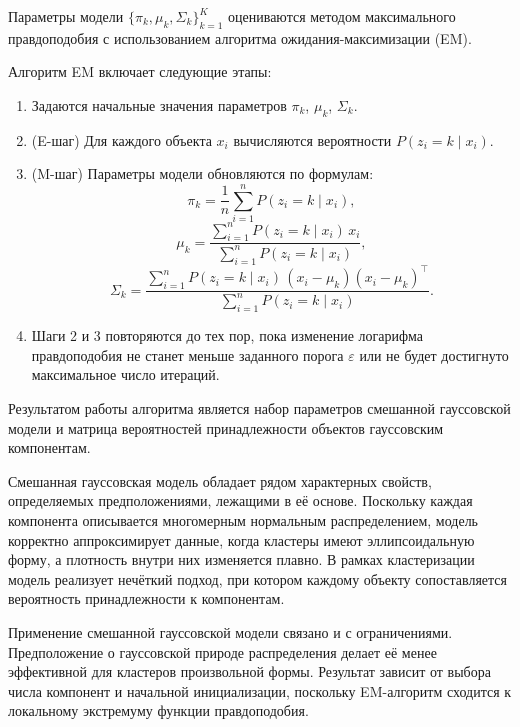 Параметры модели $\{\pi_k, \mu_k, \Sigma_k\}_{k=1}^{K}$ оцениваются методом максимального правдоподобия с использованием алгоритма ожидания-максимизации (EM).

Алгоритм EM включает следующие этапы:
\begin{enumerate}
\item Задаются начальные значения параметров $\pi_k$, $\mu_k$, $\Sigma_k$.
\item (E-шаг) Для каждого объекта $x_i$ вычисляются вероятности $P(z_i = k \mid x_i)$.
\item (M-шаг) Параметры модели обновляются по формулам:
\begin{equation}
\pi_k = \frac{1}{n} \sum_{i=1}^{n} P(z_i = k \mid x_i),
\end{equation}
\begin{equation}
\mu_k = \frac{\sum\limits_{i=1}^{n} P(z_i = k \mid x_i)\, x_i}
{\sum\limits_{i=1}^{n} P(z_i = k \mid x_i)},
\end{equation}
\begin{equation}
\Sigma_k =
\frac{\sum\limits_{i=1}^{n} P(z_i = k \mid x_i)\,
(x_i - \mu_k)(x_i - \mu_k)^\top}
{\sum\limits_{i=1}^{n} P(z_i = k \mid x_i)}.
\end{equation}
\item Шаги 2 и 3 повторяются до тех пор, пока изменение логарифма правдоподобия не станет меньше заданного порога $\varepsilon$ или не будет достигнуто максимальное число итераций.
\end{enumerate}

Результатом работы алгоритма является набор параметров смешанной гауссовской модели и матрица вероятностей принадлежности объектов гауссовским компонентам.

Смешанная гауссовская модель обладает рядом характерных свойств, определяемых предположениями, лежащими в её основе. Поскольку каждая компонента описывается многомерным нормальным распределением, модель корректно аппроксимирует данные, когда кластеры имеют эллипсоидальную форму, а плотность внутри них изменяется плавно. В рамках кластеризации модель реализует нечёткий подход, при котором каждому объекту сопоставляется вероятность принадлежности к компонентам.

Применение смешанной гауссовской модели связано и с ограничениями. Предположение о гауссовской природе распределения делает её менее эффективной для кластеров произвольной формы. Результат зависит от выбора числа компонент и начальной инициализации, поскольку EM-алгоритм сходится к локальному экстремуму функции правдоподобия.

